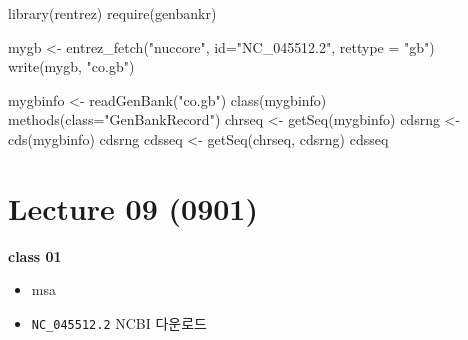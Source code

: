 \documentclass[
]{book}
\newenvironment{Shaded}{\begin{snugshade}}{\end{snugshade}}
\newcommand{\AttributeTok}[1]{\textcolor[rgb]{0.77,0.63,0.00}{#1}}
\newcommand{\FunctionTok}[1]{\textcolor[rgb]{0.00,0.00,0.00}{#1}}
\newcommand{\NormalTok}[1]{#1}
\newcommand{\OtherTok}[1]{\textcolor[rgb]{0.56,0.35,0.01}{#1}}
\newcommand{\StringTok}[1]{\textcolor[rgb]{0.31,0.60,0.02}{#1}}
\providecommand{\tightlist}{%
  \setlength{\itemsep}{0pt}\setlength{\parskip}{0pt}}
\begin{document}
\begin{Shaded}
\begin{Highlighting}[]
\FunctionTok{library}\NormalTok{(rentrez)}
\FunctionTok{require}\NormalTok{(genbankr)}

\NormalTok{mygb }\OtherTok{\textless{}{-}} \FunctionTok{entrez\_fetch}\NormalTok{(}\StringTok{"nuccore"}\NormalTok{, }\AttributeTok{id=}\StringTok{"NC\_045512.2"}\NormalTok{, }\AttributeTok{rettype =} \StringTok{"gb"}\NormalTok{)}
\FunctionTok{write}\NormalTok{(mygb, }\StringTok{"co.gb"}\NormalTok{)}

\NormalTok{mygbinfo }\OtherTok{\textless{}{-}} \FunctionTok{readGenBank}\NormalTok{(}\StringTok{"co.gb"}\NormalTok{)}
\FunctionTok{class}\NormalTok{(mygbinfo)}
\FunctionTok{methods}\NormalTok{(}\AttributeTok{class=}\StringTok{"GenBankRecord"}\NormalTok{)}
\NormalTok{chrseq }\OtherTok{\textless{}{-}} \FunctionTok{getSeq}\NormalTok{(mygbinfo)}
\NormalTok{cdsrng }\OtherTok{\textless{}{-}} \FunctionTok{cds}\NormalTok{(mygbinfo)}
\NormalTok{cdsrng}
\NormalTok{cdsseq }\OtherTok{\textless{}{-}} \FunctionTok{getSeq}\NormalTok{(chrseq, cdsrng)}
\NormalTok{cdsseq}
\end{Highlighting}
\end{Shaded}

\hypertarget{lecture-09-0901}{%
\section{Lecture 09 (0901)}\label{lecture-09-0901}}

\textbf{class 01}

\begin{itemize}
\tightlist
\item
  msa
\item
  \texttt{NC\_045512.2} NCBI 다운로드
\end{itemize}
\end{document}
